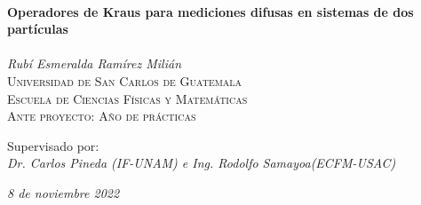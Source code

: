 
\begin{titlepage}
\vbox{ }
\vbox{ }
\begin{center}
	\HRule \\[0.4cm]
	{ \huge \bfseries Operadores de Kraus para mediciones difusas en sistemas de dos partículas}\\[0.4cm]
	\HRule \\[1.5cm]
	
	
	\Large
	\textit{Rubí Esmeralda Ramírez Milián}\\[1.5cm]
\textsc{\Large Universidad de San Carlos de Guatemala}\\[0.2cm]
\textsc{\Large Escuela de Ciencias Físicas y Matemáticas}\\[1.5cm]
\textsc{\large Ante proyecto: Año de prácticas}\\[1.5cm]
\vbox{ }



\large
Supervisado por:\\
\emph{Dr. Carlos Pineda (IF-UNAM) e Ing. Rodolfo Samayoa(ECFM-USAC)}\\
\vfill

{\large\emph{8 de noviembre 2022}}
\end{center}
\end{titlepage}